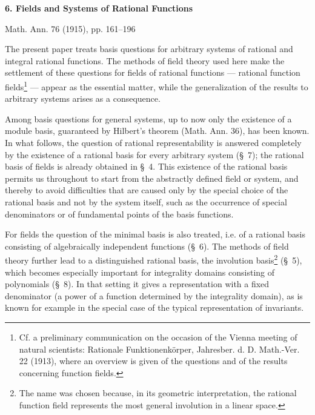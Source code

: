 \documentclass[11pt]{article}
\begin{document}
\clearpage

\begin{center}
{\Large\bfseries 6. Fields and Systems of Rational Functions}\par
\vspace{1.2em}
Math. Ann. 76 (1915), pp. 161--196
\end{center}

\vspace{2em}

The present paper treats basis questions for arbitrary systems of rational and integral rational functions. The methods of field theory used here make the settlement of these questions for fields of rational functions --- rational function fields\footnote{Cf. a preliminary communication on the occasion of the Vienna meeting of natural scientists: Rationale Funktionenkörper, Jahresber. d. D. Math.-Ver. 22 (1913), where an overview is given of the questions and of the results concerning function fields.} --- appear as the essential matter, while the generalization of the results to arbitrary systems arises as a consequence.

Among basis questions for general systems, up to now only the existence of a module basis, guaranteed by Hilbert's theorem (Math. Ann. 36), has been known. In what follows, the question of rational representability is answered completely by the existence of a rational basis for every arbitrary system (\S\ 7); the rational basis of fields is already obtained in \S\ 4. This existence of the rational basis permits us throughout to start from the abstractly defined field or system, and thereby to avoid difficulties that are caused only by the special choice of the rational basis and not by the system itself, such as the occurrence of special denominators or of fundamental points of the basis functions.

For fields the question of the minimal basis is also treated, i.e. of a rational basis consisting of algebraically independent functions (\S\ 6). The methods of field theory further lead to a distinguished rational basis, the involution basis\footnote{The name was chosen because, in its geometric interpretation, the rational function field represents the most general involution in a linear space.} (\S\ 5), which becomes especially important for integrality domains consisting of polynomials (\S\ 8). In that setting it gives a representation with a fixed denominator (a power of a function determined by the integrality domain), as is known for example in the special case of the typical representation of invariants.
\end{document}
